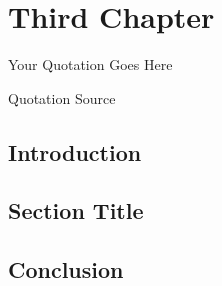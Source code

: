 
\chapter{Third Chapter}
\epigraph{Your Quotation Goes Here}{Quotation Source}

\section{Introduction}
\lipsum[5-8]

\section{Section Title}
\lipsum[11-16]

\section{Conclusion}
\lipsum[58]